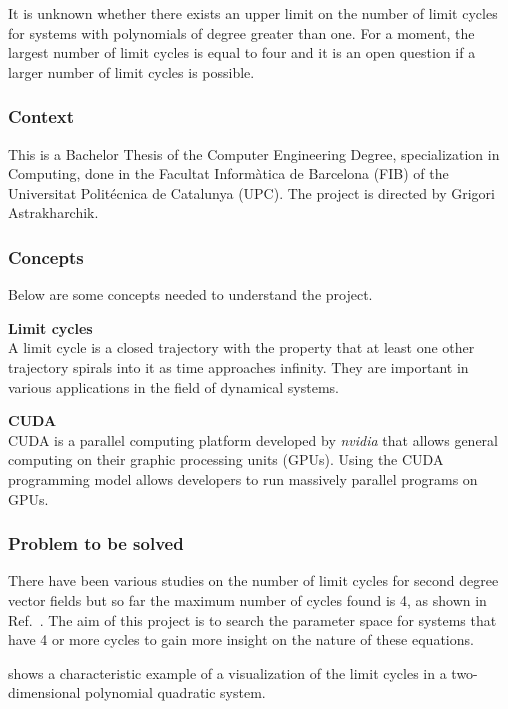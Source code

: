 It is unknown whether there exists an upper limit on the number of limit cycles
for systems with polynomials of degree greater than
one\cite{ilyashenko_centennial_2002}.  For a moment, the largest number of limit
cycles is equal to four and it is an open question if a larger number of limit
cycles is possible.

\subsubsection{Context}

This is a Bachelor Thesis of the Computer Engineering Degree, specialization in
Computing, done in the Facultat Inform\`atica de Barcelona (FIB) of the
Universitat Polit\'ecnica de Catalunya (UPC). The project is directed by Grigori
Astrakharchik.

\subsubsection{Concepts}

Below are some concepts needed to understand the project.

\newcommand{\concept}[1]{\textbf{#1}\\}

\concept{Limit cycles}
A limit cycle is a closed trajectory with the property that at least one other
trajectory spirals into it as time approaches infinity. They are important in
various applications in the field of dynamical systems.

\concept{CUDA}
CUDA is a parallel computing platform developed by \emph{nvidia} that allows general
computing on their graphic processing units (GPUs). Using the CUDA programming
model allows developers to run massively parallel programs on GPUs.

\subsubsection{Problem to be solved}

There have been various studies on the number of limit cycles for second degree
vector fields but so far the maximum number of cycles found is 4, as shown in
Ref.~\cite{kuznetsov_visualization_2013}. The aim of this project is to search
the parameter space for systems that have 4 or more cycles to gain more insight
on the nature of these equations.

 shows a characteristic example of a visualization of the
limit cycles in a two-dimensional polynomial quadratic system.


